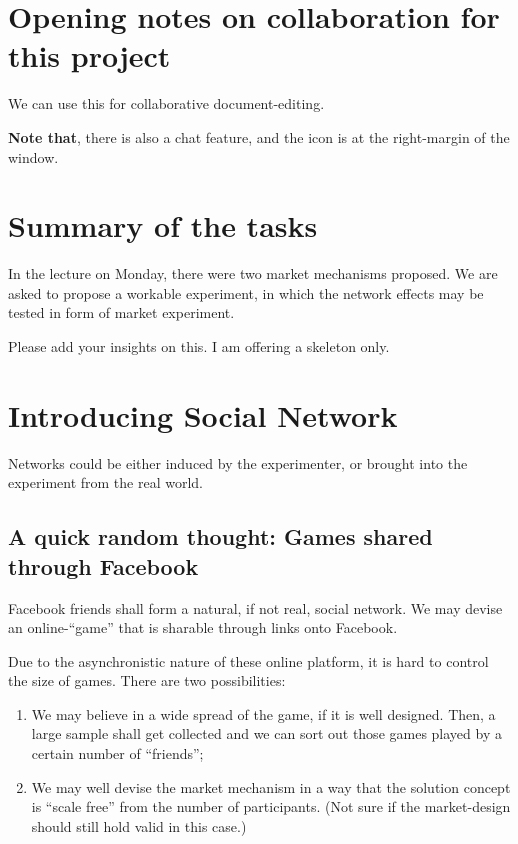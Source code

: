 
\section{Opening notes on collaboration for this project}%

We can use this for collaborative document-editing.

\textbf{Note that}, there is also a chat feature, and the icon is at the right-margin of the window.

\section{Summary of the tasks}

In the lecture on Monday, there were two market mechanisms proposed. We are
asked to propose a workable experiment, in which the network effects may be
tested in form of market experiment.

Please add your insights on this. I am offering a skeleton only.

\section{Introducing Social Network}

Networks could be either induced by the experimenter, or brought into the
experiment from the real world.

\subsection{A quick random thought: Games shared through Facebook}

Facebook friends shall form a natural, if not real, social network. We
may devise an online-``game'' that is sharable through links onto Facebook.

Due to the asynchronistic nature of these online platform, it is hard to control
the size of games. There are two possibilities:
\begin{enumerate}
    \item We may believe in a wide spread of the game, if it is well designed.
        Then, a large sample shall get collected and we can sort out those games
        played by a certain number of ``friends'';
    \item We may well devise the market mechanism in a way that the solution
        concept is ``scale free'' from the number of participants. (Not sure if
        the market-design should still hold valid in this case.)
\end{enumerate}

